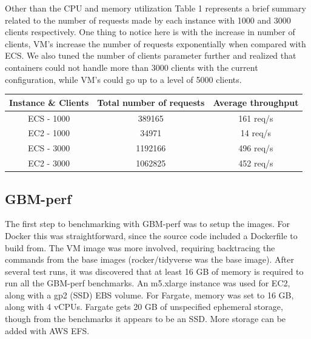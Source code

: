 \documentclass[11pt]{article}
\begin{document}
Other than the CPU and memory utilization Table 1 represents a brief summary related to the number of requests made by each instance with 1000 and 3000 clients respectively. One thing to notice here is with the increase in number of clients, VM's increase the number of requests exponentially when compared with ECS. We also tuned the number of clients parameter further and realized that containers could not handle more than 3000 clients with the current configuration, while VM's could go up to a level of 5000 clients.

\begin{center}
\captionsetup[table]{position=bottom}
 \begin{tabular}{||c c c ||} 
 \hline
 Instance \& Clients & Total number of requests & Average throughput  \\ [0.5ex] 
 \hline
 ECS - 1000 & 389165 & 161 req/s  \\ 
 \hline
 EC2 - 1000 & 34971 & 14 req/s \\ 
 \hline
 ECS - 3000 & 1192166 & 496 req/s  \\ 
 \hline
 EC2 - 3000 & 1062825 & 452 req/s \\ 
  \hline

\end{tabular}

\end{center}

\subsection{GBM-perf}

The first step to benchmarking with GBM-perf was to setup the images. For Docker this was straightforward, since the source code included a Dockerfile to build from. The VM image was more involved, requiring backtracing the commands from the base images (rocker/tidyverse was the base image). After several test runs, it was discovered that at least 16 GB of memory is required to run all the GBM-perf benchmarks. An m5.xlarge instance was used for EC2, along with a gp2 (SSD) EBS volume. For Fargate, memory was set to 16 GB, along with 4 vCPUs. Fargate gets 20 GB of unspecified ephemeral storage, though from the benchmarks it appears to be an SSD. More storage can be added with AWS EFS.
\end{document}
